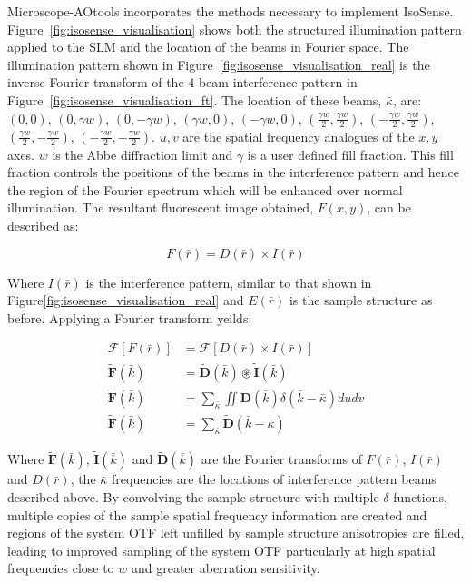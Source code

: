 	Microscope-AOtools incorporates the methods necessary to implement
	IsoSense. Figure~\ref{fig:isosense_visualisation} shows both
	the structured illumination pattern applied to the SLM 
	and the location of the beams in Fourier space. The illumination
	pattern shown in Figure~\ref{fig:isosense_visualisation_real} is
	the inverse Fourier transform of the 4-beam interference pattern 
	in Figure~\ref{fig:isosense_visualisation_ft}. The location 
	of these beams, $\bar{\kappa}$, are: 
	$(0,0)$, $(0,\gamma w)$, $(0,-\gamma w)$, $(\gamma w, 0)$, 
	$(-\gamma w, 0)$, $(\frac{\gamma w}{2}, \frac{\gamma w}{2})$, 
	$(-\frac{\gamma w}{2}, \frac{\gamma w}{2})$, $(\frac{\gamma w}{2},
	 -\frac{\gamma w}{2})$, $(-\frac{\gamma w}{2}, 
	 -\frac{\gamma w}{2})$. $u,v$ are the spatial frequency 
	analogues of the $x,y$ axes. $w$ is the Abbe diffraction limit and 
	$\gamma$ is a user defined fill fraction. This fill
	fraction controls the positions of the beams in the interference
	pattern and hence the region of the Fourier spectrum which will 
	be enhanced over normal illumination. The resultant fluorescent image 
	obtained, $F(x,y)$, can be described as:
	
	\begin{equation}\label{eq:isosense_real}
		F(\bar{r}) = D(\bar{r}) \times I(\bar{r})
	\end{equation}	
	
	Where $I(\bar{r})$ is the interference pattern, similar to that shown in 
	Figure\ref{fig:isosense_visualisation_real} and $E(\bar{r})$ is the sample
	structure as before. Applying a Fourier transform yeilds:
	
	\begin{equation}\label{eq:isosense_ft}
		\begin{split}
			\mathcal{F}[F(\bar{r})] &= \mathcal{F}[D(\bar{r})\times I(\bar{r})] \\
			\tilde{\textbf{F}}(\bar{k}) &= \tilde{\textbf{D}}(\bar{k}) \circledast \tilde{\textbf{I}}(\bar{k}) \\
			\tilde{\textbf{F}}(\bar{k}) &= \sum_{\bar{\kappa}}\iint\tilde{\textbf{D}}(\bar{k})\delta(\bar{k} - \bar{\kappa})dudv \\
			\tilde{\textbf{F}}(\bar{k}) &= \sum_{\bar{\kappa}}\tilde{\textbf{D}}(\bar{k} - \bar{\kappa})
		\end{split}
	\end{equation}
	
	Where $\tilde{\textbf{F}}(\bar{k})$, $\tilde{\textbf{I}}(\bar{k})$ and 
	$\tilde{\textbf{D}}(\bar{k})$ are the Fourier transforms of $F(\bar{r})$, 
	$I(\bar{r})$ and $D(\bar{r})$, the $\bar{\kappa}$ frequencies are the 
	locations of interference pattern beams described above. By convolving 
	the sample structure with multiple $\delta$-functions, multiple copies 
	of the sample spatial frequency information are created and regions of 
	the system OTF left unfilled by sample structure anisotropies are 
	filled, leading to improved sampling of the system OTF particularly
	at high spatial frequencies close to $w$ and greater aberration
	sensitivity.\cite{vzurauskas2019isosense}
	
